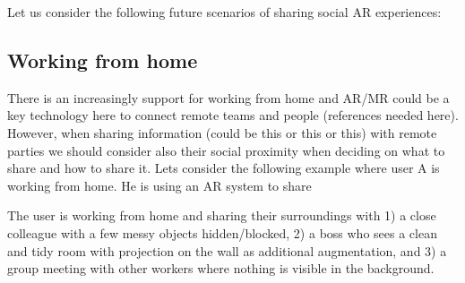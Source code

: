 

Let us consider the following future scenarios of sharing social AR experiences:

\subsection{Working from home}

There is an increasingly support for working from home \cite{Bloom2015, Crosbie2004, Olson1984} and AR/MR could be a key technology here to connect remote teams and people \cite{Koehne2012} (references needed here). However, when sharing information (could be this or this or this) with remote parties we should consider also their social proximity when deciding on what to share and how to share it. Lets consider the following example where user A is working from home. He is using an AR system to share

The user is working from home and sharing their surroundings with 1) a close colleague with a few messy objects hidden/blocked, 2) a boss who sees a clean and tidy room with projection on the wall as additional augmentation, and 3) a group meeting with other workers where nothing is visible in the background. 

